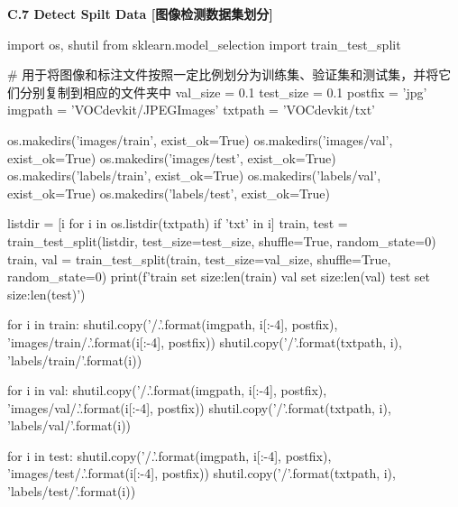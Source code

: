 \documentclass{MathorCupmodeling}
\begin{document}
\textbf{C.7 Detect Spilt Data [图像检测数据集划分]}
\begin{python}
import os, shutil
from sklearn.model_selection import train_test_split

# 用于将图像和标注文件按照一定比例划分为训练集、验证集和测试集，并将它们分别复制到相应的文件夹中
val_size = 0.1
test_size = 0.1
postfix = 'jpg'
imgpath = 'VOCdevkit/JPEGImages'
txtpath = 'VOCdevkit/txt'

os.makedirs('images/train', exist_ok=True)
os.makedirs('images/val', exist_ok=True)
os.makedirs('images/test', exist_ok=True)
os.makedirs('labels/train', exist_ok=True)
os.makedirs('labels/val', exist_ok=True)
os.makedirs('labels/test', exist_ok=True)

listdir = [i for i in os.listdir(txtpath) if 'txt' in i]
train, test = train_test_split(listdir, test_size=test_size, shuffle=True, random_state=0)
train, val = train_test_split(train, test_size=val_size, shuffle=True, random_state=0)
print(f'train set size:{len(train)} val set size:{len(val)} test set size:{len(test)}')

for i in train:
    shutil.copy('{}/{}.{}'.format(imgpath, i[:-4], postfix), 'images/train/{}.{}'.format(i[:-4], postfix))
    shutil.copy('{}/{}'.format(txtpath, i), 'labels/train/{}'.format(i))

for i in val:
    shutil.copy('{}/{}.{}'.format(imgpath, i[:-4], postfix), 'images/val/{}.{}'.format(i[:-4], postfix))
    shutil.copy('{}/{}'.format(txtpath, i), 'labels/val/{}'.format(i))

for i in test:
    shutil.copy('{}/{}.{}'.format(imgpath, i[:-4], postfix), 'images/test/{}.{}'.format(i[:-4], postfix))
    shutil.copy('{}/{}'.format(txtpath, i), 'labels/test/{}'.format(i))
\end{python}
\end{document}
